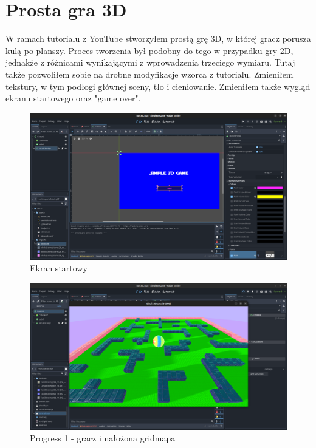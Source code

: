 \documentclass[a4paper]{article}
\begin{document}
\begin{sloppypar}
	\section[htb]{Prosta gra 3D}
	W ramach tutorialu z YouTube stworzyłem prostą grę 3D, w której gracz porusza kulą po planszy. Proces tworzenia był podobny
	do tego w przypadku gry 2D, jednakże z różnicami wynikającymi z wprowadzenia trzeciego wymiaru.
	Tutaj także pozwoliłem sobie na drobne modyfikacje wzorca z tutorialu. Zmieniłem tekstury, w tym podłogi głównej sceny, tło i cieniowanie.
	Zmieniłem także wygląd ekranu startowego oraz "game over".
	\begin{center}
		\begin{figure}[htb]
			\centering
			\includegraphics[width=1\textwidth]{3d/start-screen.png}
			\caption{Ekran startowy}
		\end{figure}
		\begin{figure}[htb]
			\centering
			\includegraphics[width=1\textwidth]{3d/progress1.png}
			\caption{Progress 1 - gracz i nałożona gridmapa}
		\end{figure}
	\end{center}
\end{sloppypar}
\end{document}
